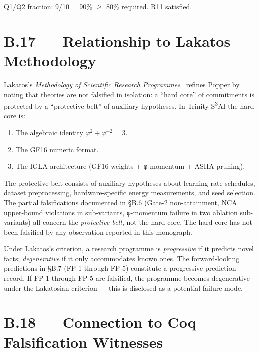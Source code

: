 \noindent Q1/Q2 fraction: 9/10 = 90\% $\geq$ 80\% required.  R11 satisfied.

\section*{B.17 — Relationship to Lakatos Methodology}
\label{sec:lakatos}

\noindent Lakatos's \emph{Methodology of Scientific Research
Programmes}~\cite{lakatos1970methodology} refines Popper by noting that
theories are not falsified in isolation: a ``hard core'' of commitments is
protected by a ``protective belt'' of auxiliary hypotheses.  In Trinity
S\textsuperscript{3}AI the hard core is:

\begin{enumerate}
  \item The algebraic identity $\varphi^{2} + \varphi^{-2} = 3$.
  \item The GF16 numeric format.
  \item The IGLA architecture (GF16 weights + φ-momentum + ASHA pruning).
\end{enumerate}

\noindent The protective belt consists of auxiliary hypotheses about
learning rate schedules, dataset preprocessing, hardware-specific energy
measurements, and seed selection.  The partial falsifications documented in
§B.6 (Gate-2 non-attainment, NCA upper-bound violations in sub-variants, φ-momentum
failure in two ablation sub-variants) all concern the \emph{protective belt},
not the hard core.  The hard core has not been falsified by any observation
reported in this monograph.

\medskip

\noindent Under Lakatos's criterion, a research programme is \emph{progressive}
if it predicts novel facts; \emph{degenerative} if it only accommodates known
ones.  The forward-looking predictions in §B.7 (FP-1 through FP-5) constitute
a progressive prediction record.  If FP-1 through FP-5 are falsified,
the programme becomes degenerative under the Lakatosian criterion —
this is disclosed as a potential failure mode.

\section*{B.18 — Connection to Coq Falsification Witnesses}
\label{sec:coq-falsification}

